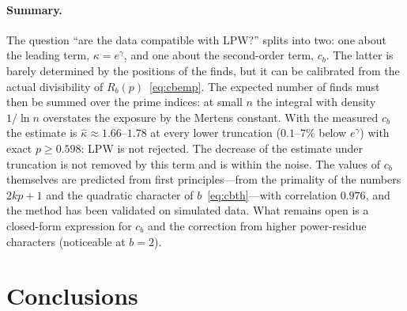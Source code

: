 \documentclass[11pt,a4paper]{article}
\theoremstyle{plain}
\theoremstyle{remark}
\newcommand{\Rb}{R_b}
\newcommand{\eg}{e^{\gamma}}
\begin{document}
\paragraph{Summary.} The question ``are the data compatible with LPW?'' splits
into two: one about the leading term, $\kappa=\eg$, and one about the
second-order term, $c_b$. The latter is barely determined by the positions of
the finds, but it can be calibrated from the actual divisibility of
$\Rb(p)$~\eqref{eq:cbemp}. The expected number of finds must then be summed over
the prime indices: at small $n$ the integral with density $1/\ln n$ overstates
the exposure by the Mertens constant. With the measured $c_b$ the estimate is
$\hat\kappa\approx1.66$--$1.78$ at every lower truncation ($0.1$--$7\%$ below
$\eg$) with exact $p\ge0.598$: LPW is not rejected. The decrease of the
estimate under truncation is not removed by this term and is within the noise.
The values of $c_b$ themselves are predicted from first
principles---from the primality of the numbers $2kp+1$ and the quadratic
character of $b$~\eqref{eq:cbth}---with correlation $0.976$, and the method has
been validated on simulated data. What remains open is a closed-form expression
for $c_b$ and the correction from higher power-residue characters (noticeable at
$b=2$).

\section{Conclusions}
\end{document}
